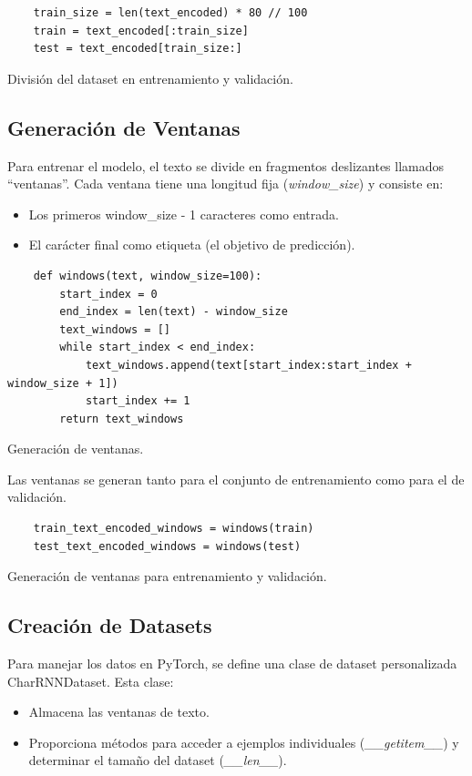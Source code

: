 \documentclass{article}
\begin{document}
\begin{listing}[H]
\begin{verbatim}
    train_size = len(text_encoded) * 80 // 100
    train = text_encoded[:train_size]
    test = text_encoded[train_size:]
\end{verbatim}
\caption{División del dataset en entrenamiento y validación.}
\end{listing}

\subsection{Generación de Ventanas}
Para entrenar el modelo, el texto se divide en fragmentos deslizantes llamados ``ventanas''. Cada ventana tiene una longitud fija (\textit{window\_size}) y consiste en:
\begin{itemize}
    \item Los primeros window\_size - 1 caracteres como entrada.
    \item El carácter final como etiqueta (el objetivo de predicción).
\end{itemize}

\begin{listing}[H]
\begin{verbatim}
    def windows(text, window_size=100):
        start_index = 0
        end_index = len(text) - window_size
        text_windows = []
        while start_index < end_index:
            text_windows.append(text[start_index:start_index + window_size + 1])
            start_index += 1
        return text_windows
\end{verbatim}
\caption{Generación de ventanas.}
\end{listing}

Las ventanas se generan tanto para el conjunto de entrenamiento como para el de validación.

\begin{listing}[H]
\begin{verbatim}
    train_text_encoded_windows = windows(train)
    test_text_encoded_windows = windows(test)
\end{verbatim}
\caption{Generación de ventanas para entrenamiento y validación.}
\end{listing}

\newpage

\subsection{Creación de Datasets}
Para manejar los datos en PyTorch, se define una clase de dataset personalizada CharRNNDataset. Esta clase:
\begin{itemize}
    \item Almacena las ventanas de texto.
    \item Proporciona métodos para acceder a ejemplos individuales (\textit{\_\_getitem\_\_}) y determinar el tamaño del dataset (\textit{\_\_len\_\_}).
\end{itemize}
\end{document}

